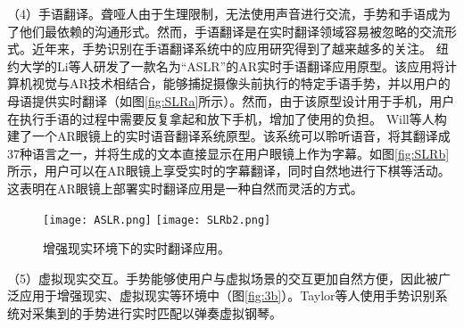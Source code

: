 （4）手语翻译。聋哑人由于生理限制，无法使用声音进行交流，手势和手语成为了他们最依赖的沟通形式。然而，手语翻译是在实时翻译领域容易被忽略的交流形式\cite{SLR1}。近年来，手势识别在手语翻译系统中的应用研究得到了越来越多的关注\cite{伍杰2019基于视觉的实时手势识别方法研究}。
纽约大学的Li等人研发了一款名为“ASLR”的AR实时手语翻译应用原型\cite{SLR1}。该应用将计算机视觉与AR技术相结合，能够捕捉摄像头前执行的特定手语手势，并以用户的母语提供实时翻译（如图\ref{fig:SLRa}所示）。然而，由于该原型设计用于手机，用户在执行手语的过程中需要反复拿起和放下手机，增加了使用的负担。
Will等人构建了一个AR眼镜上的实时语音翻译系统原型\cite{SLR2}。该系统可以聆听语音，将其翻译成37种语言之一，并将生成的文本直接显示在用户眼镜上作为字幕。如图\ref{fig:SLRb}所示，用户可以在AR眼镜上享受实时的字幕翻译，同时自然地进行下棋等活动。这表明在AR眼镜上部署实时翻译应用是一种自然而灵活的方式。

\begin{figure}
  \centering
    {\texttt{[image: ASLR.png]}}
    {\texttt{[image: SLRb2.png]}}
  \caption{增强现实环境下的实时翻译应用。}
  \label{fig:SLR}
\end{figure}


（5）虚拟现实交互。手势能够使用户与虚拟场景的交互更加自然方便，因此被广泛应用于增强现实、虚拟现实等环境中（图\ref{fig:3b}）。Taylor等人使用手势识别系统对采集到的手势进行实时匹配以弹奏虚拟钢琴\cite{taylor2016efficient}。

